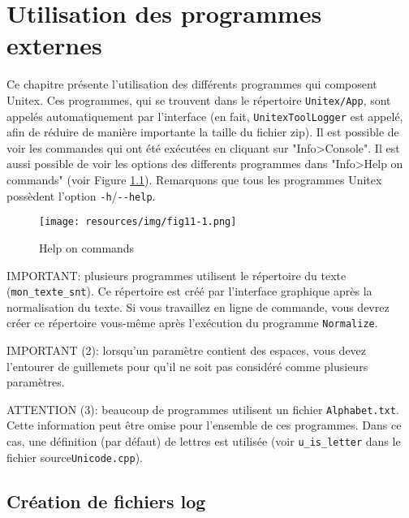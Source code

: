 \chapter{Utilisation des programmes externes}
\label{chap-external-programs}
Ce chapitre présente l’utilisation des différents programmes qui composent Unitex. Ces
programmes, qui se trouvent dans le répertoire \verb+Unitex/App+, sont appelés automatiquement par
l'interface (en fait, \verb+UnitexToolLogger+ est appelé, afin de réduire de manière importante la taille du fichier zip).
Il est possible de voir les commandes qui ont été exécutées en cliquant sur  "Info>Console". Il est aussi possible de voir les options des differents programmes dans "Info>Help on commands" (voir Figure \ref{fig-help}). Remarquons que tous les programmes Unitex possèdent l'option \verb$-h$/\verb$--help$.

\bigskip
\begin{figure}[!ht]
\begin{center}
\texttt{[image: resources/img/fig11-1.png]}
\caption{Help on commands\label{fig-help}}
\end{center}
\end{figure}

\bigskip
\noindent IMPORTANT: plusieurs programmes utilisent le répertoire du texte (\verb+mon_texte_snt+).
Ce répertoire est créé par l’interface graphique après la normalisation du texte. Si vous travaillez en ligne de commande, vous devrez créer ce répertoire vous-même après l’exécution du programme
\verb+Normalize+.

\bigskip
\noindent IMPORTANT (2): lorsqu’un paramètre contient des espaces, vous devez l’entourer de
guillemets pour qu’il ne soit pas considéré comme plusieurs paramètres.


\bigskip
\noindent ATTENTION (3): beaucoup de programmes utilisent un fichier \verb+Alphabet.txt+. Cette
information peut être omise pour l'ensemble de ces programmes. Dans ce cas, une définition (par
défaut) de lettres est utilisée (voir \verb+u_is_letter+ dans le fichier source\verb$Unicode.cpp$).


\section{Création de fichiers log}
\label{section-creating-log-files}

